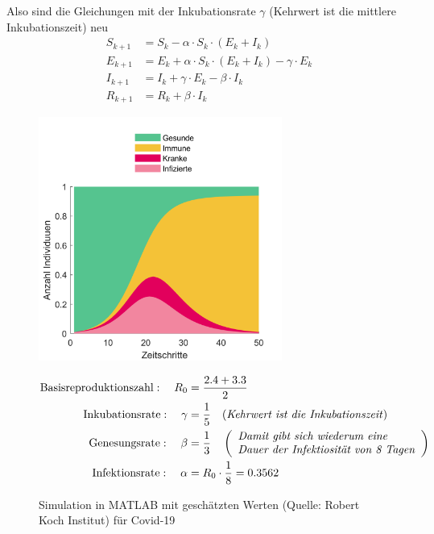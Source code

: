 \documentclass[11pt,a4paper]{article}
\begin{document}
\noindent
Also sind die Gleichungen mit der Inkubationsrate \(\gamma\) (Kehrwert ist die mittlere Inkubationszeit) neu 
\begin{align*}
	S_{k+1} &= S_k - \alpha \cdot S_k \cdot \left( E_k + I_k \right) \\
	E_{k+1} &= E_k + \alpha \cdot S_k \cdot \left( E_k + I_k \right) - \gamma \cdot E_k \\
	I_{k+1} &= I_k + \gamma \cdot E_k - \beta \cdot I_k \\
	R_{k+1} &= R_k + \beta \cdot I_k
\end{align*}


\begin{figure}[h]
  	\centering
 	\includegraphics[width=8cm]{SEIR_EplusI.png}
  	\caption{Simulation in MATLAB mit geschätzten Werten (Quelle: Robert Koch Institut) für Covid-19}
  	\begin{align*}
  		\textrm{Basisreproduktionszahl}:\quad
  		R_0 &= \frac{2.4 + 3.3}{2}\\
  		\textrm{Inkubationsrate}:\quad
  		\gamma &= \frac{1}{5} \quad
  		\textrm{(\textit{Kehrwert ist die Inkubationszeit})}\\
  		\textrm{Genesungsrate}:\quad
  		\beta &= \frac{1}{3} \quad
  		\left(\begin{array}{l}
  			\textrm{\textit{Damit gibt sich wiederum eine}}\\
  			\textrm{\textit{Dauer der Infektiosität von 8 Tagen}}
  		\end{array}\right)\\
  		\textrm{Infektionsrate}:\quad
  		\alpha &= R_0 \cdot \frac{1}{8} = 0.3562\
  	\end{align*}
\end{figure}

\newpage
\end{document}
